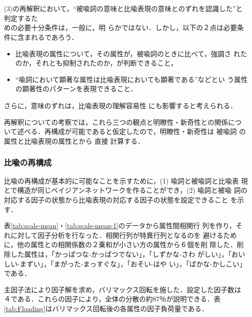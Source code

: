 (3)の再解釈において，``被喩詞の意味と比喩表現の意味との$\dot{\mbox{ず}}
\dot{\mbox{れ}}$を認識した''と判定するた\\めの必要十分条件は，一般に，明
らかではない．しかし，以下の２点は必要条件に含まれるであろう．
\begin{itemize}
\item 比喩表現の属性について，その属性が，被喩詞のときに比べて，強調さ
れたのか，それとも抑制されたのか，が判断できること，
\item ``喩詞において顕著な属性は比喩表現においても顕著である''などとい
う属性の顕著性のパターンを表現できること．
\end{itemize}
さらに，意味の$\dot{\mbox{ず}}\dot{\mbox{れ}}$は，比喩表現の理解容易性
にも影響すると考えられる．

再解釈についての考察では，これら三つの観点と明瞭性・新奇性との関係につ
いて述べる．再構成が可能であると仮定したので，明瞭性・新奇性は 被喩詞
の属性と比喩表現の属性とから 直接 計算する．

\subsubsection{比喩の再構成}

比喩の再構成が基本的に可能なことを示すために，(1) 喩詞と被喩詞と比喩表
現とで構造が同じベイジアンネットワークを作ることができ，(2) 喩詞と被喩
詞の対応する因子の状態から比喩表現の対応する因子の状態を設定できること
を示す．

表\ref{tab:scale-mean}・\ref{tab:scale-mean-1}のデータから属性間相関行
列を作り，それに対して因子分析を行なった．相関行列が特異行列となるのを
避けるために，他の属性との相関係数の２乗和が小さい方の属性から６個を削
除した．削除した属性は，「かっぱつな-かっぱつでない」，「しずかな-さわ
がしい」，「おいしい-まずい」，「まがった-まっすぐな」，「おそい-はや
い」，「ばかな-かしこい」である．

主因子法により因子解を求め，バリマックス回転を施した．設定した因子数は
４である．これらの因子により，全体の分散の約87％が説明できる．表
\ref{tab:Floading}はバリマックス回転後の各属性の因子負荷量である．

